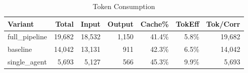 \begin{table}[htbp]
\centering
\caption{Token Consumption}
\label{tab:tokens}
\begin{tabular}{l rrrr rr}
\toprule
Variant & Total & Input & Output & Cache\% & TokEff & Tok/Corr \\
\midrule
  full\_pipeline & 19,682 & 18,532 & 1,150 & 41.4\% & 5.8\% & 19,682 \\
  baseline & 14,042 & 13,131 & 911 & 42.3\% & 6.5\% & 14,042 \\
  single\_agent & 5,693 & 5,127 & 566 & 45.3\% & 9.9\% & 5,693 \\
\bottomrule
\end{tabular}
\end{table}
